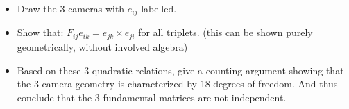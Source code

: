 \documentclass[11pt]{article}
\begin{document}
\begin{itemize}
\item Draw the 3 cameras with $e_{ij}$ labelled.
\item Show that: $F_{ij}e_{ik} = e_{jk} \times e_{ji}$ for all triplets. (this can be shown purely geometrically, without 
involved algebra)
\item Based on these 3 quadratic relations, give a counting argument showing that the 3-camera geometry is characterized by 18 degrees of freedom. And thus conclude that the $3$ fundamental matrices are not independent.
\end{itemize}

\end{document}
